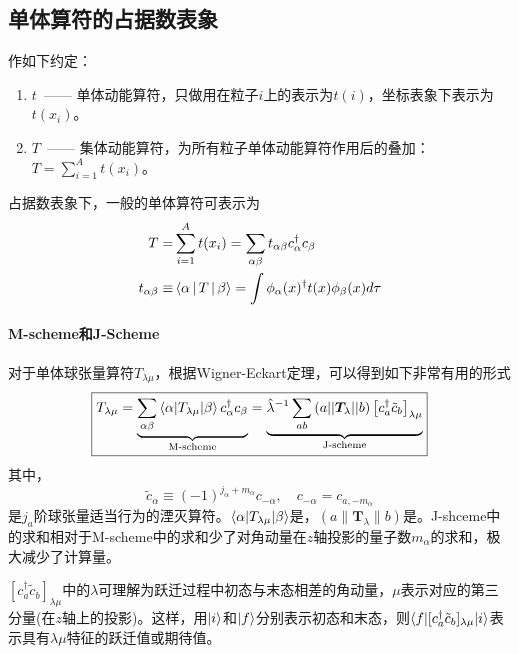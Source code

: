 \subsection{单体算符的占据数表象}
作如下约定：
\begin{enumerate}
    \item $t$\ —— 单体动能算符，只做用在粒子$i$上的表示为$t(i)$，坐标表象下表示为$t(x_i)$。
    \item $T$\ —— 集体动能算符，为所有粒子单体动能算符作用后的叠加：$T = \sum_{i = 1}^{A} t(x_i)$。
\end{enumerate}
占据数表象下，一般的单体算符可表示为
\begin{equation}
    \begin{aligned}
        T =& \sum_{i = 1}^{A} t(x_i) = \sum_{\alpha\beta} t_{\alpha\beta}c_{\alpha}^{\dagger}c_{\beta} \\
        t_{\alpha\beta} \equiv & \Braket{\alpha | T | \beta} = \int \phi_{\alpha}(x)^{\dagger} t(x) \phi_{\beta}(x) d\tau
    \end{aligned}
\end{equation}

\paragraph*{M-scheme和J-Scheme}
对于单体球张量算符$T_{\lambda\mu}$，根据Wigner-Eckart定理，可以得到如下非常有用的形式
\begin{equation}
    \boxed{
    T_{\lambda\mu} = 
    \underbrace{ \sum_{\alpha\beta}\braket{\alpha | T_{\lambda\mu} | \beta} c_{\alpha}^{\dagger} c_{\beta}}_{\text{M-scheme}}
    =\underbrace{\hat{\lambda}^{-1} \sum_{ab}\left(a || \bm{T}_{\lambda} || b\right) \left[c_{a}^{\dagger}\tilde{c}_{b} \right]_{\lambda\mu}}_{\text{J-scheme}}
    }
    \label{eq:sing-reduced-part-elem}
\end{equation}
其中，
\begin{equation}
    \tilde{c}_{\alpha} \equiv (-1)^{j_{\alpha} + m_{\alpha}} c_{-\alpha},
    \quad
    c_{-\alpha} = c_{a, -m_\alpha}
    \label{eq:sp.annihilation}
\end{equation}
是$j_{a}$阶球张量适当行为的湮灭算符。$\braket{\alpha | T_{\lambda\mu} | \beta}$是，$\left(a \| \bm{T}_{\lambda} \| b\right)$是。J-shceme中的求和相对于M-scheme中的求和少了对角动量在$z$轴投影的量子数$m_{\alpha}$的求和，极大减少了计算量。

$\left[c_{a}^{\dagger}\tilde{c}_{b}\right]_{\lambda\mu}$中的$\lambda$可理解为跃迁过程中初态与末态相差的角动量，$\mu$表示对应的第三分量(在$z$轴上的投影)。这样，用$\ket{i}$和$\ket{f}$分别表示初态和末态，则$\braket{f | [c_{a}^{\dagger}\tilde{c}_{b}]_{\lambda\mu} | i}$表示具有$\lambda\mu$特征的跃迁值或期待值。


